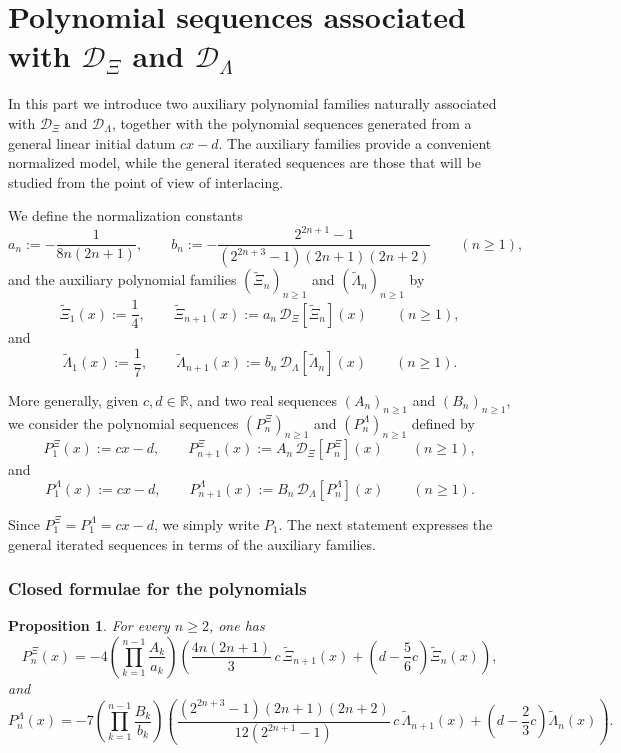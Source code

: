 \documentclass[11pt,twoside]{article}
\newtheorem{proposition}[theorem]{Proposition}
\numberwithin{equation}{section}
\begin{document}
\part{Polynomial sequences associated with \texorpdfstring{$\mathcal D_{\Xi}$ and $\mathcal D_{\Lambda}$}{DXi and DLambda}}

In this part we introduce two auxiliary polynomial families naturally associated with
\(\mathcal D_{\Xi}\) and \(\mathcal D_{\Lambda}\), together with the polynomial
sequences generated from a general linear initial datum \(cx-d\). The auxiliary
families provide a convenient normalized model, while the general iterated sequences
are those that will be studied from the point of view of interlacing.

We define the normalization constants
\[
a_n:=-\frac{1}{8n(2n+1)},
\qquad
b_n:=-\frac{2^{2n+1}-1}{(2^{2n+3}-1)(2n+1)(2n+2)}
\qquad (n\ge1),
\]
and the auxiliary polynomial families \((\widetilde{\Xi}_n)_{n\ge1}\) and
\((\widetilde{\Lambda}_n)_{n\ge1}\) by
\[
\widetilde{\Xi}_1(x):=\frac14,
\qquad
\widetilde{\Xi}_{n+1}(x):=a_n\,\mathcal D_{\Xi}[\widetilde{\Xi}_n](x)
\qquad (n\ge1),
\]
and
\[
\widetilde{\Lambda}_1(x):=\frac17,
\qquad
\widetilde{\Lambda}_{n+1}(x):=b_n\,\mathcal D_{\Lambda}[\widetilde{\Lambda}_n](x)
\qquad (n\ge1).
\]

More generally, given \(c,d\in\mathbb R\), and two real sequences
\((A_n)_{n\ge1}\) and \((B_n)_{n\ge1}\), we consider the polynomial sequences
\((P_n^\Xi)_{n\ge1}\) and \((P_n^\Lambda)_{n\ge1}\) defined by
\[
P_1^\Xi(x):=cx-d,
\qquad
P_{n+1}^\Xi(x):=A_n\,\mathcal D_{\Xi}[P_n^\Xi](x)
\qquad (n\ge1),
\]
and
\[
P_1^\Lambda(x):=cx-d,
\qquad
P_{n+1}^\Lambda(x):=B_n\,\mathcal D_{\Lambda}[P_n^\Lambda](x)
\qquad (n\ge1).
\]

Since \(P_1^\Xi=P_1^\Lambda=cx-d\), we simply write \(P_1\). The next statement expresses the general iterated sequences in terms of the
auxiliary families.

\section{Closed formulae for the polynomials}

\begin{proposition}\label{prop:closed-form-iterates}
For every \(n\ge2\), one has
\[
P_n^\Xi(x)
=
-4\left(\displaystyle\prod_{k=1}^{n-1}\frac{A_k}{a_k}\right)
\left(
\frac{4n(2n+1)}{3}\,c\,\widetilde{\Xi}_{n+1}(x)
+
\left(d-\frac56c\right)\widetilde{\Xi}_n(x)
\right),
\]
and
\[
P_n^\Lambda(x)
=
-7\left(\displaystyle\prod_{k=1}^{n-1}\frac{B_k}{b_k}\right)
\left(
\frac{(2^{2n+3}-1)(2n+1)(2n+2)}{12(2^{2n+1}-1)}\,c\,\widetilde{\Lambda}_{n+1}(x)
+
\left(d-\frac23c\right)\widetilde{\Lambda}_n(x)
\right).
\]
\end{proposition}
\end{document}
